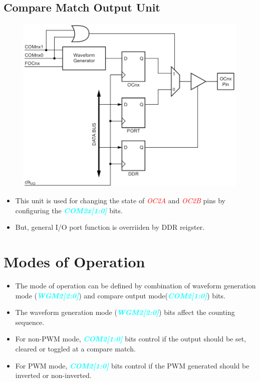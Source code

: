 \documentclass{article}
\newcommand{\bitFormat}[1]{\emph{\textbf{\textcolor{cyan}{#1}}}}
\newcommand{\pinFormat}[1]{\emph{\textcolor{red}{#1}}}
\begin{document}
\subsection{Compare Match Output Unit}
\begin{figure}[H]
    \begin{center}
        \includegraphics[height=0.3\textheight]{Timer0ComparteMatch.png}
    \end{center}
\end{figure}
\begin{itemize}
    \item This unit is used for changing the state of \pinFormat{OC2A} and \pinFormat{OC2B} pins by configuring the \bitFormat{COM2x[1:0]} bits.
    \item But, general I/O port function is overriiden by DDR reigster.
\end{itemize}

\section{Modes of Operation}
\begin{itemize}
    \item The mode of operation can be defined by combination of waveform generation mode (\bitFormat{WGM2[2:0]}) and compare output mode(\bitFormat{COM2[1:0]}) bits.
    \item The waveform generation mode (\bitFormat{WGM2[2:0]}) bits affect the counting sequence.
    \item For non-PWM mode, \bitFormat{COM2[1:0]} bits control if the output should be set, cleared or toggled at a compare match.
    \item For PWM mode, \bitFormat{COM2[1:0]} bits control if the PWM generated should be inverted or non-inverted.
\end{itemize}
\end{document}
